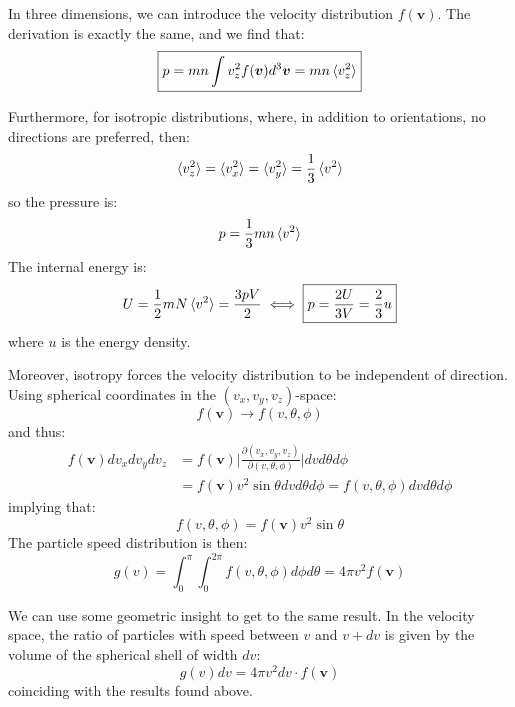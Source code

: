 \documentclass[a4paper,11pt,oneside]{book}
\newcommand{\BF}[1]{\boldsymbol{#1}}
\begin{document}
In three dimensions, we can introduce the velocity distribution $f(\BF{v})$. The derivation is exactly the same, and we find that:
\begin{equation}
    \boxed{p=mn \int v_z^2 f(\BF{v}) d^3\BF{v} = mn \braket{v_z^2}}
\end{equation}


Furthermore, for isotropic distributions, where, in addition to orientations, no directions are preferred, then:
\begin{equation}
    \braket{v_z^2}= \braket{v_x^2}= \braket{v_y^2} = \frac{1}{3} \braket{v^2}
\end{equation}
so the pressure is:
\begin{equation}\label{press}
    p = \frac{1}{3}mn\braket{v^2}
\end{equation}
The internal energy is:
\begin{equation}
    U = \frac{1}{2}mN\braket{v^2} = \frac{3 pV}{2} \iff \boxed{p=\frac{2U}{3V}=\frac{2}{3}u}
\end{equation}
where $u$ is the energy density.


Moreover, isotropy forces the velocity distribution to be independent of direction. Using spherical coordinates in the $(v_x,v_y,v_z)$-space:
\begin{equation}
    f(\BF{v}) \rightarrow f(v, \theta, \phi)
\end{equation}
and thus:
\begin{align}
    f(\BF{v}) dv_x dv_y dv_z &= f(\BF{v}) \bigg|\frac{\partial(v_x, v_y, v_z)}{\partial(v,\theta,\phi)}\bigg| dv d\theta d\phi\\
    &=f(\BF{v})  v^2 \sin \theta dv d\theta d\phi = f(v,\theta,\phi) dv d\theta d\phi
\end{align}
implying that:
\begin{equation}
    f(v, \theta, \phi) = f(\BF{v}) v^2 \sin \theta 
\end{equation}
The particle speed distribution is then:
\begin{equation}
    \boxed{g(v) = \int_0^\pi \int_0^{2\pi} f(v, \theta, \phi) d\phi d\theta = 4\pi v^2 f(\BF{v})}
\end{equation}

We can use some geometric insight to get to the same result. In the velocity space, the ratio of particles with speed between $v$ and $v+dv$ is given by the volume of the spherical shell of width $dv$:
\begin{equation}
   g(v) dv = 4 \pi v^2 dv \cdot f(\BF{v})
\end{equation}
coinciding with the results found above. 
\end{document}

